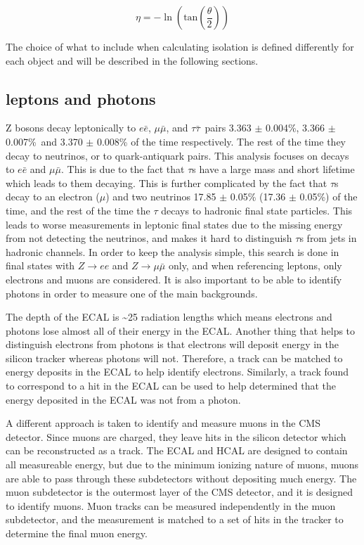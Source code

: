 \begin{equation}
  \label{eqn:psuedorapidity}
  \eta = -\ln(\mathrm{tan}(\frac{\theta}{2}))
\end{equation}

The choice of what to include when calculating isolation is defined differently for each object and will be described in the following sections.

\subsection{leptons and photons}
\label{ssec:lepsandphots}
Z bosons decay leptonically to $e\bar{e}$, $\mu\bar{\mu}$, and $\tau\bar{\tau}$~pairs 3.363 $\pm$ 0.004\%, 3.366 $\pm$ 0.007\%\ and 3.370 $\pm$ 0.008\% of the time respectively.
The rest of the time they decay to neutrinos, or to quark-antiquark pairs.
This analysis focuses on decays to $e\bar{e}$ and $\mu\bar{\mu}$.
This is due to the fact that $\tau$s have a large mass and short lifetime which leads to them decaying.
This is further complicated by the fact that $\tau$s decay to an electron ($\mu$) and two neutrinos 17.85 $\pm$ 0.05\% (17.36 $\pm$ 0.05\%) of the time,
and the rest of the time the $\tau$ decays to hadronic final state particles.
This leads to worse measurements in leptonic final states due to the missing energy from not detecting the neutrinos,
and makes it hard to distinguish $\tau$s from jets in hadronic channels.
In order to keep the analysis simple, this search is done in final states with $Z\rightarrow ee$ and $Z\rightarrow\mu\bar{\mu}$ only,
and when referencing leptons, only electrons and muons are considered.
It is also important to be able to identify photons in order to measure one of the main backgrounds.

The depth of the ECAL is \textasciitilde{}25 radiation lengths which means electrons and photons lose almost all of their energy in the ECAL.
Another thing that helps to distinguish electrons from photons is that electrons will deposit energy in the silicon tracker whereas photons will not.
Therefore, a track can be matched to energy deposits in the ECAL to help identify electrons.
Similarly, a track found to correspond to a hit in the ECAL can be used to help determined that the energy deposited in the ECAL was not from a photon.

A different approach is taken to identify and measure muons in the CMS detector.
Since muons are charged, they leave hits in the silicon detector which can be reconstructed as a track.
The ECAL and HCAL are designed to contain all measureable energy,
but due to the minimum ionizing nature of muons, muons are able to pass through these subdetectors without depositing much energy.
The muon subdetector is the outermost layer of the CMS detector, and it is designed to identify muons.
Muon tracks can be measured independently in the muon subdetector,
and the measurement is matched to a set of hits in the tracker to determine the final muon energy.


